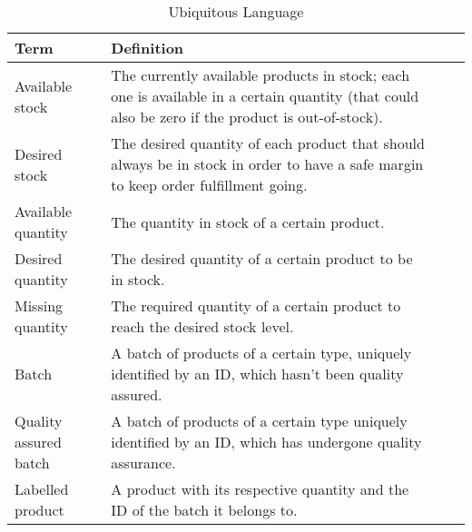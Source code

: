 \begin{table}[H]
    \centering
    \begin{tabular}{|p{}|*{3}{>{\arraybackslash}p{}|}}
        \hline
        Term                  & Definition                                                                                                                                       \\ \hline
        Available stock       & The currently available products in stock; each one is available in a certain quantity (that could also be zero if the product is out-of-stock). \\ \hline
        Desired stock         & The desired quantity of each product that should always be in stock in order to have a safe margin to keep order fulfillment going.              \\ \hline
        Available quantity    & The quantity in stock of a certain product.                                                                                                      \\ \hline
        Desired quantity      & The desired quantity of a certain product to be in stock.                                                                                        \\ \hline
        Missing quantity      & The required quantity of a certain product to reach the desired stock level.                                                                     \\ \hline
        Batch                 & A batch of products of a certain type, uniquely identified by an ID, which hasn't been quality assured.                                          \\ \hline
        Quality assured batch & A batch of products of a certain type uniquely identified by an ID, which has undergone quality assurance.                                       \\ \hline
        Labelled product      & A product with its respective quantity and the ID of the batch it belongs to.                                                                    \\ \hline
    \end{tabular}
    \caption{Ubiquitous Language}
\end{table}

